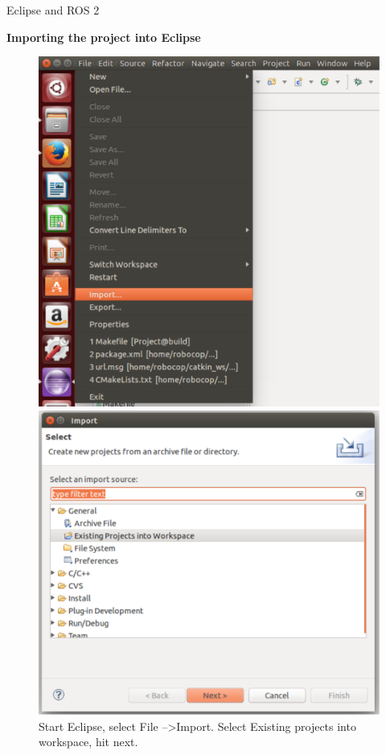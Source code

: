 \documentclass{beamer}
\begin{document}
\begin{frame}{Eclipse and ROS 2}

 \textbf{Importing the project into Eclipse}

\begin{figure}[htb]
    \centering
    \begin{minipage}{0.45\linewidth}
        \centering
        \includegraphics[scale=0.3]{./images/import.pdf}
    \end{minipage}
    \begin{minipage}{0.45\linewidth}
        \centering
        \includegraphics[scale=0.35]{./images/select.pdf}
    \end{minipage}
        \caption{Start Eclipse, select File  --\textgreater  Import. Select Existing projects into workspace, hit next.}
\end{figure}

\end{frame}
\end{document}
